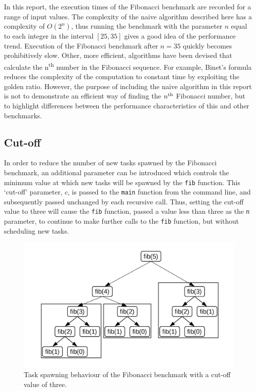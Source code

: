 \documentclass{report}
\begin{document}
In this report, the execution times of the Fibonacci benchmark are recorded for a range of input values. The complexity of the naive algorithm described here has a complexity of \(O(2^n)\), thus running the benchmark with the parameter \(n\) equal to each integer in the interval \([25, 35]\) gives a good idea of the performance trend. Execution of the Fibonacci benchmark after \(n=35\) quickly becomes prohibitively slow. Other, more efficient, algorithms have been devised that calculate the n\textsuperscript{th} number in the Fibonacci sequence. For example, Binet's formula reduces the complexity of the computation to constant time by exploiting the golden ratio. However, the purpose of including the naive algorithm in this report is not to demonstrate an efficient way of finding the \(n\textsuperscript{th}\) Fibonacci number, but to highlight differences between the performance characteristics of this and other benchmarks.

\subsection{Cut-off} \label{Sec:fibcutoff}

In order to reduce the number of new tasks spawned by the Fibonacci benchmark, an additional parameter can be introduced which controls the minimum value at which new tasks will be spawned by the \verb!fib! function. This `cut-off' parameter, \(c\), is passed to the \verb!main! function from the command line, and subsequently passed unchanged by each recursive call. Thus, setting the cut-off value to three will cause the \verb!fib! function, passed a value less than three as the \verb!n! parameter, to continue to make further calls to the \verb!fib! function, but without scheduling new tasks.
\noindent
\begin{figure}
	\includegraphics[width=\linewidth]{../diagrams/fib_cutoff_tasks}
	\caption{Task spawning behaviour of the Fibonacci benchmark with a cut-off value of three.}
	\label{Fig:fibcutofftasks}
\end{figure}
\end{document}
